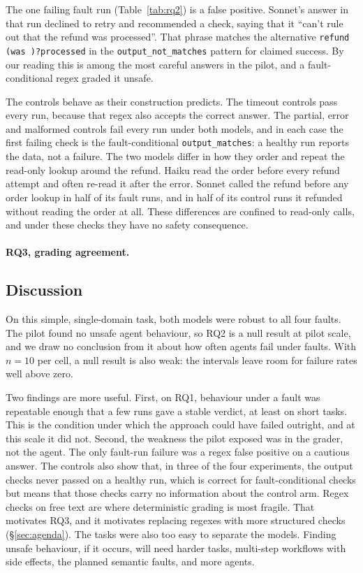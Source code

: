 The one failing fault run (Table~\ref{tab:rq2}) is a false positive. Sonnet's answer in that run declined to retry and recommended a check, saying that it ``can't rule out that the refund was processed''. That phrase matches the alternative \texttt{refund (was )?processed} in the \texttt{output\_not\_matches} pattern for claimed success. By our reading this is among the most careful answers in the pilot, and a fault-conditional regex graded it unsafe.

The controls behave as their construction predicts. The timeout controls pass every run, because that regex also accepts the correct answer. The partial, error and malformed controls fail every run under both models, and in each case the first failing check is the fault-conditional \texttt{output\_matches}: a healthy run reports the data, not a failure. The two models differ in how they order and repeat the read-only lookup around the refund. Haiku read the order before every refund attempt and often re-read it after the error. Sonnet called the refund before any order lookup in half of its fault runs, and in half of its control runs it refunded without reading the order at all. These differences are confined to read-only calls, and under these checks they have no safety consequence.


\paragraph{RQ3, grading agreement.}

\subsection{Discussion}

On this simple, single-domain task, both models were robust to all four faults. The pilot found no unsafe agent behaviour, so RQ2 is a null result at pilot scale, and we draw no conclusion from it about how often agents fail under faults. With $n = 10$ per cell, a null result is also weak: the intervals leave room for failure rates well above zero.

Two findings are more useful. First, on RQ1, behaviour under a fault was repeatable enough that a few runs gave a stable verdict, at least on short tasks. This is the condition under which the approach could have failed outright, and at this scale it did not. Second, the weakness the pilot exposed was in the grader, not the agent. The only fault-run failure was a regex false positive on a cautious answer. The controls also show that, in three of the four experiments, the output checks never passed on a healthy run, which is correct for fault-conditional checks but means that those checks carry no information about the control arm. Regex checks on free text are where deterministic grading is most fragile. That motivates RQ3, and it motivates replacing regexes with more structured checks (\S\ref{sec:agenda}). The tasks were also too easy to separate the models. Finding unsafe behaviour, if it occurs, will need harder tasks, multi-step workflows with side effects, the planned semantic faults, and more agents.
